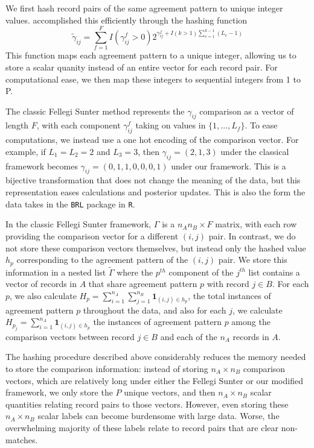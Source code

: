 \documentclass[12pt,letterpaper]{article}
\newcommand{\1}[1]{\mathbb{I}\!\left[#1\right]} %
\begin{document}
We first hash record pairs of the same agreement pattern to unique integer values. \citep{enamorado2019} accomplished this efficiently through the hashing function
$$\tilde{\gamma}_{ij} = \sum_{f = 1}^F I(\gamma_{ij}^f > 0)2^{\gamma_{ij}^f + I(k>1)\sum_{e=1}^{k-1}(L_e -1)}$$
This function maps each agreement pattern to a unique integer, allowing us to store a scalar quanity instead of an entire vector for each record pair. For computational ease, we then map these integers to sequential integers from 1 to P. 

The classic Fellegi Sunter method represents the \(\gamma_{ij}\)
comparison as a vector of length \(F\), with each component
\(\gamma_{ij}^f\) taking on values in \(\{1, \ldots, L_f \}\). To ease
computations, we instead use a one hot encoding of the comparison vector. For example, if
\(L_1 = L_2 = 2\) and \(L_3 = 3\), then \(\gamma_{ij} = (2, 1, 3)\)
under the classical framework becomes
\(\gamma_{ij} = (0, 1, 1, 0, 0, 0, 1)\) under our framework. This is a
bijective transformation that does not change the meaning of the data,
but this representation eases calculations and posterior updates. This is also the form the data takes in the \texttt{BRL} package in \texttt{R}. 

In the classic Fellegi Sunter framework, \(\Gamma\) is a
\(n_A n_B \times F\) matrix, with each row providing the comparison
vector for a different \((i,j)\) pair. In contrast, we do not store
these comparison vectors themselves, but instead only the hashed value $h_p$
corresponding to the agreement pattern of the \((i, j)\) pair. We store
this information in a nested list \(\tilde{\Gamma}\) where the
\(p^{th}\) component of the \(j^{th}\) list contains a vector of records
in \(A\) that share agreement pattern \(p\) with record \(j \in B\). For
each \(p\), we also calculate
\(H_p = \sum_{i=1}^{n_A}\sum_{j=1}^{n_B} \mathbf{1}_{(i,j) \in h_p}\),
the total instances of agreement pattern \(p\) throughout the data, and
also for each \(j\), we calculate
\(H_{p_j} = \sum_{i=1}^{n_A} \mathbf{1}_{{(i,j) \in h_p}}\) the
instances of agreement pattern \(p\) among the comparison vectors
between record \(j \in B\) and each of the \(n_A\) records in \(A\).

The hashing procedure described above considerably reduces the memory
needed to store the comparison information: instead of storing
\(n_A \times n_B\) comparison vectors, which are relatively long under
either the Fellegi Sunter or our modified framework, we only store the
\(P\) unique vectors, and then \(n_A \times n_B\) scalar quantities
relating record pairs to those vectors. However, even storing these
\(n_A \times n_B\) scalar labels can become burdensome with large data.
Worse, the overwhelming majority of these labels relate to record pairs
that are clear non-matches.
\end{document}
